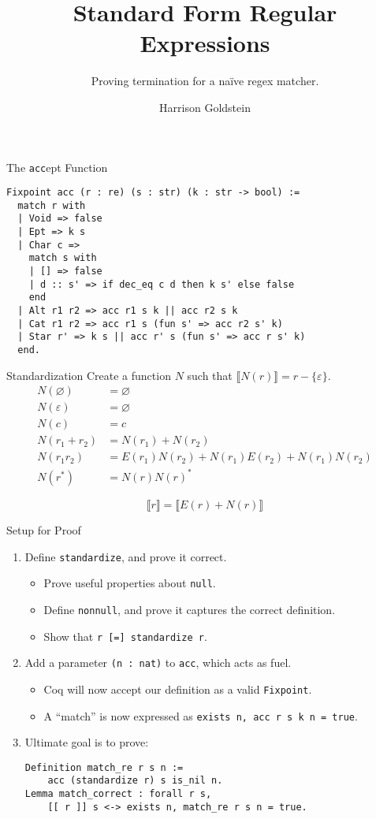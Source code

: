 \documentclass[10pt]{beamer}
\title{Standard Form Regular Expressions}
\subtitle{Proving termination for a na\"ive regex matcher.}
\date{}
\author{Harrison Goldstein}
\institute{Cornell University}
\newcommand{\coq}[1]{\texttt{#1}}
\begin{document}
\maketitle

\begin{frame}[fragile]{The \texttt{acc}ept Function}
  \begin{verbatim}
Fixpoint acc (r : re) (s : str) (k : str -> bool) :=
  match r with
  | Void => false
  | Ept => k s
  | Char c =>
    match s with
    | [] => false
    | d :: s' => if dec_eq c d then k s' else false
    end
  | Alt r1 r2 => acc r1 s k || acc r2 s k
  | Cat r1 r2 => acc r1 s (fun s' => acc r2 s' k)
  | Star r' => k s || acc r' s (fun s' => acc r s' k)
  end.
  \end{verbatim}
\end{frame}

\begin{frame}[fragile]{Standardization}
  Create a function $N$ such that $\llbracket N(r) \rrbracket = r -
  \{\varepsilon\}$.
  \begin{align*}
    N(\varnothing) &= \varnothing \\
    N(\varepsilon) &= \varnothing \\
    N(c) &= c \\
    N(r_1 + r_2) &= N(r_1) + N(r_2) \\
    N(r_1r_2) &= E(r_1)N(r_2) + N(r_1)E(r_2) + N(r_1)N(r_2) \\
    N(r^*) &= N(r)N(r)^*
  \end{align*}

  $$ \boxed{\llbracket r \rrbracket = \llbracket E(r) + N(r) \rrbracket} $$
\end{frame}

\begin{frame}[fragile]{Setup for Proof}
  \begin{enumerate}
  \item Define \coq{standardize}, and prove it correct.
    \begin{itemize}
    \item Prove useful properties about \coq{null}.
    \item Define \coq{nonnull}, and prove it captures the correct definition.
    \item Show that \coq{r [=] standardize r}.
    \end{itemize}
  \item Add a parameter \coq{(n : nat)} to \coq{acc}, which acts as fuel.
    \begin{itemize}
    \item Coq will now accept our definition as a valid \coq{Fixpoint}.
    \item A ``match'' is now expressed as \coq{exists n, acc r s k n = true}.
    \end{itemize}
  \item Ultimate goal is to prove:
\begin{verbatim}
Definition match_re r s n :=
    acc (standardize r) s is_nil n.
Lemma match_correct : forall r s,
    [[ r ]] s <-> exists n, match_re r s n = true.
\end{verbatim}
  \end{enumerate}
\end{frame}
\end{document}

